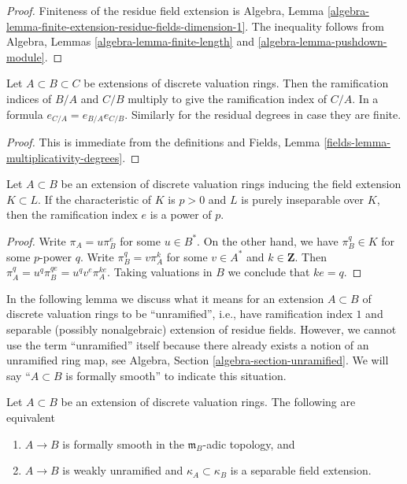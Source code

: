 \begin{proof}
Finiteness of the residue field extension is
Algebra, Lemma \ref{algebra-lemma-finite-extension-residue-fields-dimension-1}.
The inequality follows from
Algebra, Lemmas \ref{algebra-lemma-finite-length} and
\ref{algebra-lemma-pushdown-module}.
\end{proof}

\begin{lemma}
\label{lemma-multiplicative-e-f}
Let $A \subset B \subset C$ be extensions of discrete valuation rings.
Then the ramification indices of $B/A$ and $C/B$ multiply to give
the ramification index of $C/A$. In a formula $e_{C/A} = e_{B/A} e_{C/B}$.
Similarly for the residual degrees in case they are finite.
\end{lemma}

\begin{proof}
This is immediate from the definitions and
Fields, Lemma \ref{fields-lemma-multiplicativity-degrees}.
\end{proof}

\begin{lemma}
\label{lemma-ramification-index-a-power-of-p}
Let $A \subset B$ be an extension of discrete valuation rings
inducing the field extension $K \subset L$. If the characteristic
of $K$ is $p > 0$ and $L$ is purely inseparable over $K$, then
the ramification index $e$ is a power of $p$.
\end{lemma}

\begin{proof}
Write $\pi_A = u \pi_B^e$ for some $u \in B^*$. On the other hand, we have
$\pi_B^q \in K$ for some $p$-power $q$. Write
$\pi_B^q = v \pi_A^k$ for some $v \in A^*$ and $k \in \mathbf{Z}$.
Then $\pi_A^q = u^q \pi_B^{qe} = u^q v^e \pi_A^{ke}$.
Taking valuations in $B$ we conclude that $ke = q$.
\end{proof}

\noindent
In the following lemma we discuss what it means for an extension $A \subset B$
of discrete valuation rings to be ``unramified'', i.e., have ramification
index $1$ and separable (possibly nonalgebraic) extension of residue fields.
However, we cannot use the term ``unramified'' itself because there already
exists a notion of an unramified ring map, see
Algebra, Section \ref{algebra-section-unramified}.
We will say ``$A \subset B$ is formally smooth'' to indicate
this situation.

\begin{lemma}
\label{lemma-extension-dvrs-formally-smooth}
Let $A \subset B$ be an extension of discrete valuation rings.
The following are equivalent
\begin{enumerate}
\item $A \to B$ is formally smooth in the $\mathfrak m_B$-adic topology, and
\item $A \to B$ is weakly unramified and $\kappa_A \subset \kappa_B$
is a separable field extension.
\end{enumerate}
\end{lemma}

